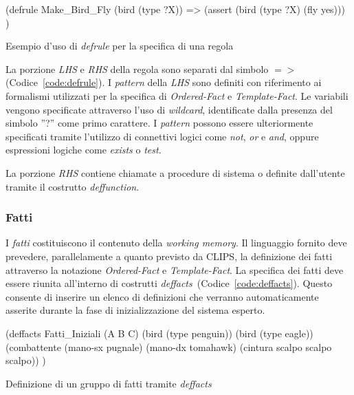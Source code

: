 \begin{program}
\begin{verbatimtab}

(defrule Make_Bird_Fly
	(bird (type ?X))
	=>
	(assert (bird (type ?X)	(fly yes)))
)
\end{verbatimtab}
\caption{Esempio d'uso di \emph{defrule} per la specifica di una regola}\label{code:defrule}
\end{program}

La porzione \emph{LHS} e \emph{RHS} della regola sono separati dal simbolo $=>$ (Codice~\ref{code:defrule}). I \emph{pattern} della \emph{LHS} sono definiti con riferimento ai formalismi utilizzati per la specifica di \emph{Ordered-Fact} e \emph{Template-Fact}. Le variabili vengono specificate attraverso l'uso di \emph{wildcard}, identificate dalla presenza del simbolo ''?'' come primo carattere. I \emph{pattern} possono essere ulteriormente specificati tramite l'utilizzo di connettivi logici come \emph{not}, \emph{or} e \emph{and}, oppure espressioni logiche come \emph{exists} o \emph{test}.

La porzione \emph{RHS} contiene chiamate a procedure di sistema o definite dall'utente tramite il costrutto \emph{deffunction}.


\subsubsection{Fatti}\label{par:linguaggio-fatti}
I \emph{fatti} costituiscono il contenuto della \emph{working memory}. Il linguaggio fornito deve prevedere, parallelamente a quanto previsto da CLIPS, la definizione dei fatti attraverso la notazione \emph{Ordered-Fact} e \emph{Template-Fact}. La specifica dei fatti deve essere riunita all'interno di costrutti \emph{deffacts}~(Codice~\ref{code:deffacts}). Questo consente di inserire un elenco di definizioni che verranno automaticamente asserite durante la fase di inizializzazione del sistema esperto.

\begin{program}
\begin{verbatimtab}

(deffacts Fatti_Iniziali
	(A B C)
	(bird (type penguin))
	(bird (type eagle))
	(combattente
		(mano-sx pugnale)
		(mano-dx tomahawk)
		(cintura scalpo scalpo scalpo))
)
\end{verbatimtab}
\caption{Definizione di un gruppo di fatti tramite \emph{deffacts}}\label{code:deffacts}
\end{program}

